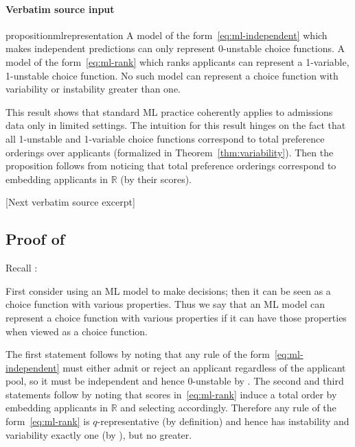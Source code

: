 \documentclass[10pt]{article}
\begin{document}
\paragraph{Verbatim source input}
\begin{ReviewVerbatim}
\begin{restatable}[ML Representation]{proposition}{mlrepresentation}
\label{prop:ml-representation}
A model of the form~\eqref{eq:ml-independent} which makes independent predictions can only represent 0-unstable choice functions.
A model of the form~\eqref{eq:ml-rank} which ranks applicants can represent a 1-variable, 1-unstable choice function. No such model can represent a choice function with variability or instability greater than one.
\end{restatable}

This result shows that standard ML practice coherently applies to admissions data only in limited settings.
The intuition for this result hinges on the fact that all 1-unstable and 1-variable choice functions correspond to total preference orderings over applicants (formalized in Theorem~\ref{thm:variability}).
Then the proposition follows from noticing that total preference orderings correspond to  embedding applicants in  $\mathbb{R}$  (by their scores).

[Next verbatim source excerpt]

\subsection{Proof of } \label{sec:ml-prop-proof}

Recall :
\mlrepresentation*

First consider using an ML model to make decisions; then it can be seen as a choice function with various properties.
Thus we say that an ML model can represent a choice function with various properties if it can have those properties when viewed as a choice function. %

The first statement follows by noting that any rule of the form~\eqref{eq:ml-independent} must either admit or reject an applicant regardless of the applicant pool, so it must be independent and hence $0$-unstable by . %
The second and third statements follow by noting that scores in~\eqref{eq:ml-rank} induce a total order by embedding applicants in $\mathbb R$ and selecting accordingly. Therefore any rule of the form~\eqref{eq:ml-rank} is $q$-representative (by definition) and hence has instability and variability exactly one (by ), but no greater.
\end{ReviewVerbatim}
\end{document}
